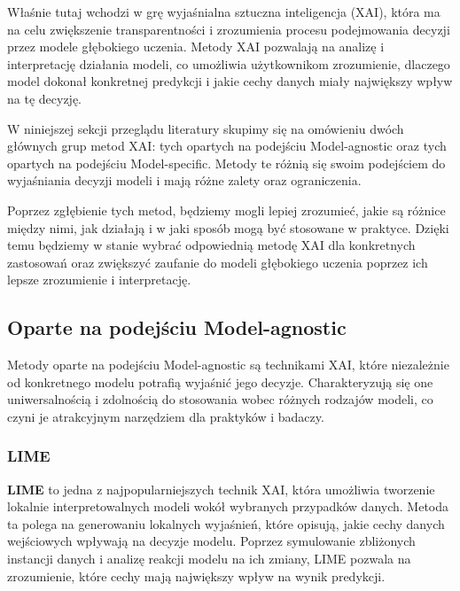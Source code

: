 Właśnie tutaj wchodzi w grę wyjaśnialna sztuczna inteligencja (XAI), która ma na celu zwiększenie transparentności i zrozumienia procesu podejmowania decyzji przez modele głębokiego uczenia.
Metody XAI pozwalają na analizę i interpretację działania modeli, co umożliwia użytkownikom zrozumienie, dlaczego model dokonał konkretnej predykcji i jakie cechy danych miały największy wpływ na tę decyzję.

W niniejszej sekcji przeglądu literatury skupimy się na omówieniu dwóch głównych grup metod XAI: tych opartych na podejściu Model-agnostic oraz tych opartych na podejściu Model-specific.
Metody te różnią się swoim podejściem do wyjaśniania decyzji modeli i mają różne zalety oraz ograniczenia.

Poprzez zgłębienie tych metod, będziemy mogli lepiej zrozumieć, jakie są różnice między nimi, jak działają i w jaki sposób mogą być stosowane w praktyce.
Dzięki temu będziemy w stanie wybrać odpowiednią metodę XAI dla konkretnych zastosowań oraz zwiększyć zaufanie do modeli głębokiego uczenia poprzez ich lepsze zrozumienie i interpretację.

\subsection*{Oparte na podejściu Model-agnostic}
Metody oparte na podejściu Model-agnostic są technikami XAI, które niezależnie od konkretnego modelu potrafią wyjaśnić jego decyzje.
Charakteryzują się one uniwersalnością i zdolnością do stosowania wobec różnych rodzajów modeli, co czyni je atrakcyjnym narzędziem dla praktyków i badaczy.

\subsubsection*{LIME}
\textbf{LIME} to jedna z najpopularniejszych technik XAI, która umożliwia tworzenie lokalnie interpretowalnych modeli wokół wybranych przypadków danych.
Metoda ta polega na generowaniu lokalnych wyjaśnień, które opisują, jakie cechy danych wejściowych wpływają na decyzje modelu.
Poprzez symulowanie zbliżonych instancji danych i analizę reakcji modelu na ich zmiany, LIME pozwala na zrozumienie, które cechy mają największy wpływ na wynik predykcji.

